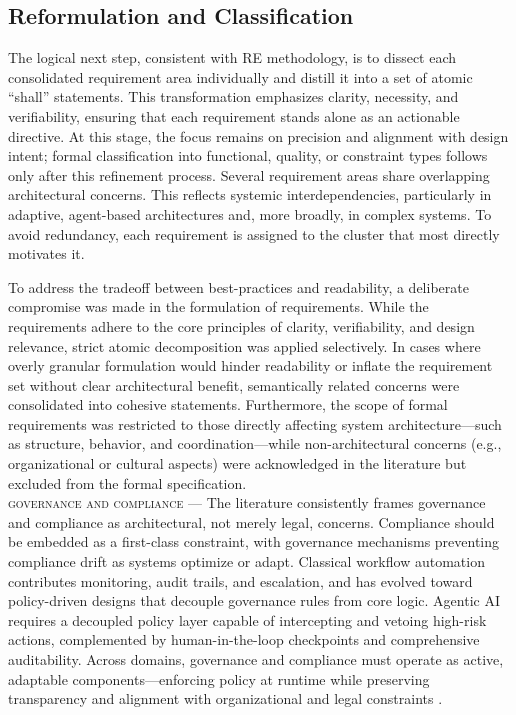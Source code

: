 \subsection{Reformulation and Classification}\label{subsec:req-clas}
The logical next step, consistent with RE methodology, is to dissect each consolidated requirement area individually and distill it into a set of atomic “shall” statements. This transformation emphasizes clarity, necessity, and verifiability, ensuring that each requirement stands alone as an actionable directive. At this stage, the focus remains on precision and alignment with design intent; formal classification into functional, quality, or constraint types follows only after this refinement process. Several requirement areas share overlapping architectural concerns. This reflects systemic interdependencies, particularly in adaptive, agent-based architectures and, more broadly, in complex systems. To avoid redundancy, each requirement is assigned to the cluster that most directly motivates it.

To address the tradeoff between best-practices and readability, a deliberate compromise was made in the formulation of requirements. While the requirements adhere to the core principles of clarity, verifiability, and design relevance, strict atomic decomposition was applied selectively. In cases where overly granular formulation would hinder readability or inflate the requirement set without clear architectural benefit, semantically related concerns were consolidated into cohesive statements. Furthermore, the scope of formal requirements was restricted to those directly affecting system architecture—such as structure, behavior, and coordination—while non-architectural concerns (e.g., organizational or cultural aspects) were acknowledged in the literature but excluded from the formal specification. \\

\noindent \textsc{governance and compliance} --- The literature consistently frames governance and compliance as architectural, not merely legal, concerns. Compliance should be embedded as a first-class constraint, with governance mechanisms preventing compliance drift as systems optimize or adapt. Classical workflow automation contributes monitoring, audit trails, and escalation, and has evolved toward policy-driven designs that decouple governance rules from core logic. Agentic AI requires a decoupled policy layer capable of intercepting and vetoing high-risk actions, complemented by human-in-the-loop checkpoints and comprehensive auditability. Across domains, governance and compliance must operate as active, adaptable components—enforcing policy at runtime while preserving transparency and alignment with organizational and legal constraints \parencite{basuResearch2002, gauravGovernance2025}.

